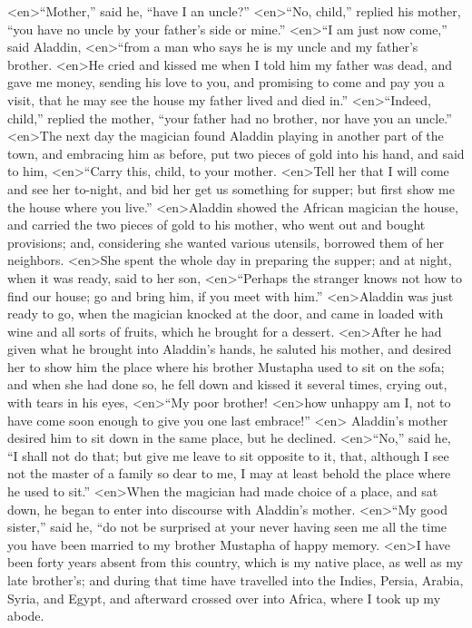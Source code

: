 <en>“Mother,” said he, “have I an uncle?” 
<en>“No, child,” replied his mother, “you have no uncle by your father’s side or mine.”
<en>“I am just now come,” said Aladdin,
<en>“from a man who says he is my uncle and my father’s brother.
<en>He cried and kissed me when I told him my father was dead, and gave me money, sending his love to you, and promising to come and pay you a visit, that he may see the house my father lived and died in.” 
<en>“Indeed, child,” replied the mother, “your father had no brother, nor have you an uncle.”
<en>The next day the magician found Aladdin playing in another part of the town, and embracing him as before, put two pieces of gold into his hand, and said to him, 
<en>“Carry this, child, to your mother.
<en>Tell her that I will come and see her to-night, and bid her get us something for supper; but first show me the house where you live.”
<en>Aladdin showed the African magician the house, and carried the two pieces of gold to his mother, who went out and bought provisions; and, considering she wanted various utensils, borrowed them of her neighbors.
<en>She spent the whole day in preparing the supper; and at night, when it was ready, said to her son, 
<en>“Perhaps the stranger knows not how to find our house; go and bring him, if you meet with him.”
<en>Aladdin was just ready to go, when the magician knocked at the door, and came in loaded with wine and all sorts of fruits, which he brought for a dessert.
<en>After he had given what he brought into Aladdin’s hands, he saluted his mother, and desired her to show him the place where his brother Mustapha used to sit on the sofa; and when she had done so, he fell down and kissed it several times, crying out, with tears in his eyes, 
<en>“My poor brother!
<en>how unhappy am I, not to have come soon enough to give you one last embrace!”
<en> Aladdin’s mother desired him to sit down in the same place, but he declined.
<en>“No,” said he, “I shall not do that; but give me leave to sit opposite to it, that, although I see not the master of a family so dear to me, I may at least behold the place where he used to sit.”
<en>When the magician had made choice of a place, and sat down, he began to enter into discourse with Aladdin’s mother.
<en>“My good sister,” said he, “do not be surprised at your never having seen me all the time you have been married to my brother Mustapha of happy memory.
<en>I have been forty years absent from this country, which is my native place, as well as my late brother’s; and during that time have travelled into the Indies, Persia, Arabia, Syria, and Egypt, and afterward crossed over into Africa, where I took up my abode.
